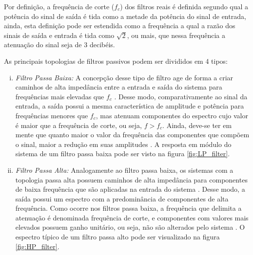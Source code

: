 Por definição, a frequência de corte ($f_c$) dos filtros reais é definida segundo qual a potência do sinal de saída é tida como a metade da potência do sinal de entrada, ainda, esta definição pode ser estendida como a frequência a qual a razão dos sinais de saída e entrada é tida como $\sqrt{2}$, ou mais, que nessa frequência a atenuação do sinal seja de 3 decibéis.

As principais topologias de filtros passivos podem ser divididos em 4 tipos:

\begin{enumerate}[i),leftmargin=1.75cm,itemindent=0cm] %
	\item 
	\textit{Filtro Passa Baixa:} A concepção desse tipo de filtro age de forma a criar caminhos de alta impedância entre a entrada e saída do sistema para frequências mais elevadas que $f_c$ \cite{Kassick2010}. Desse modo, comparativamente ao sinal da entrada, a saída possui a mesma característica de amplitude e potência para frequências menores que $f_c$, mas atenuam componentes do espectro cujo valor é maior que a frequência de corte, ou seja, $f>f_c$. Ainda, deve-se ter em mente que quanto maior o valor da frequência das componentes que compõem o sinal, maior a redução em suas amplitudes \cite{Mussoi2004}. A resposta em módulo do sistema de um filtro passa baixa pode ser visto na figura \ref{fig:LP_filter}.

	\item 
	\textit{Filtro Passa Alta:} Analogamente ao filtro passa baixa, os sistemas com a topologia passa alta possuem caminhos de alta impedância para componentes de baixa frequência que são aplicadas na entrada do sistema \cite{Kassick2010}. Desse modo, a saída possui um espectro com a predominância de componentes de alta frequência. Como ocorre nos filtros passa baixa, a frequência que delimita a atenuação é denominada frequência de corte, e componentes com valores mais elevados possuem ganho unitário, ou seja, não são alterados pelo sistema \cite{Mussoi2004}. O espectro típico de um filtro passa alto pode ser visualizado na figura \ref{fig:HP_filter}. 
		

\end{enumerate}
